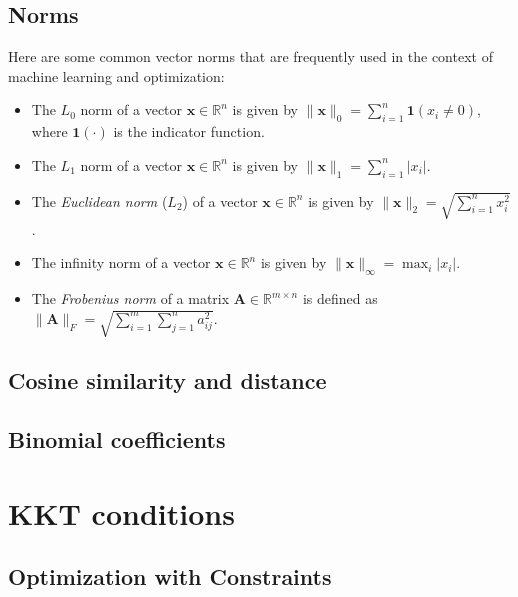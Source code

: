 \documentclass[11pt]{book} %
\begin{document}
\subsection{Norms}
Here are some common vector norms that are frequently used in the context of machine learning and optimization:
\begin{itemize}
    \item The $L_0$ norm of a vector \(\mathbf{x} \in \mathbb{R}^n\) is given by \(\lVert \mathbf{x} \rVert_0 = \sum_{i=1}^{n} \mathbf{1}(x_i \neq 0)\), where \(\mathbf{1}(\cdot)\) is the indicator function.
    \item The $L_1$ norm of a vector \(\mathbf{x} \in \mathbb{R}^n\) is given by \(\lVert \mathbf{x} \rVert_1 = \sum_{i=1}^{n} \lvert x_i \rvert\).
    \item The \textit{Euclidean norm} ($L_2$) of a vector \(\mathbf{x} \in \mathbb{R}^n\) is given by \(\lVert \mathbf{x} \rVert_2 = \sqrt{\sum_{i=1}^{n} x_i^2}\).
    \item The infinity norm of a vector \(\mathbf{x} \in \mathbb{R}^n\) is given by \(\lVert \mathbf{x} \rVert_{\infty} = \max_{i} \lvert x_i \rvert\).
    \item The \textit{Frobenius norm} of a matrix \(\mathbf{A} \in \mathbb{R}^{m \times n}\) is defined as \(\lVert \mathbf{A} \rVert_F = \sqrt{\sum_{i=1}^{m} \sum_{j=1}^{n} a_{ij}^2}\).
\end{itemize}

\subsection{Cosine similarity and distance}

\subsection{Binomial coefficients}

%
%
%

\section{KKT conditions}
\subsection{Optimization with Constraints}
\end{document}

